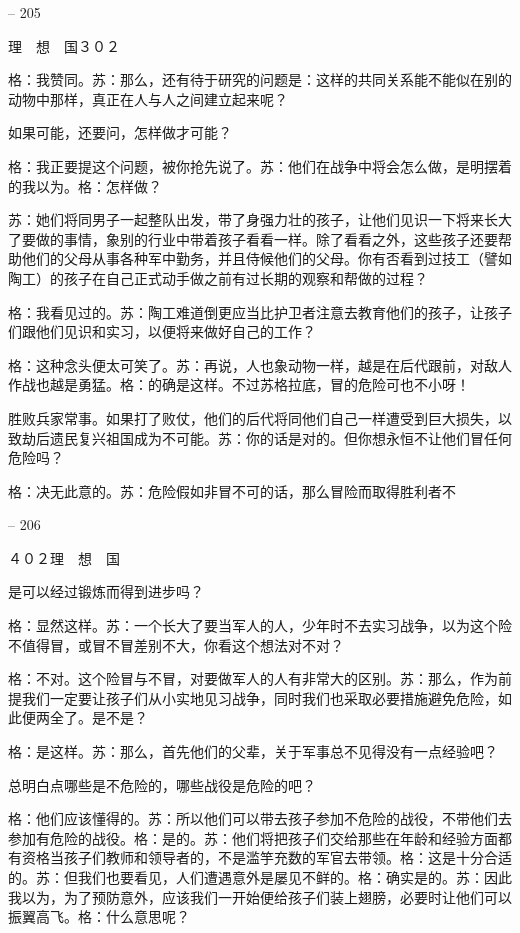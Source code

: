 \documentclass[11pt,oneside]{book}
\begin{document}
\begin{common-format}
    

-- 205

    理　想　国３０２

    格：我赞同。苏：那么，还有待于研究的问题是：这样的共同关系能不能似在别的动物中那样，真正在人与人之间建立起来呢？

    如果可能，还要问，怎样做才可能？

    格：我正要提这个问题，被你抢先说了。苏：他们在战争中将会怎么做，是明摆着的我以为。格：怎样做？

    苏：她们将同男子一起整队出发，带了身强力壮的孩子，让他们见识一下将来长大了要做的事情，象别的行业中带着孩子看看一样。除了看看之外，这些孩子还要帮助他们的父母从事各种军中勤务，并且侍候他们的父母。你有否看到过技工（譬如陶工）的孩子在自己正式动手做之前有过长期的观察和帮做的过程？

    格：我看见过的。苏：陶工难道倒更应当比护卫者注意去教育他们的孩子，让孩子们跟他们见识和实习，以便将来做好自己的工作？

    格：这种念头便太可笑了。苏：再说，人也象动物一样，越是在后代跟前，对敌人作战也越是勇猛。格：的确是这样。不过苏格拉底，冒的危险可也不小呀！

    胜败兵家常事。如果打了败仗，他们的后代将同他们自己一样遭受到巨大损失，以致劫后遗民复兴祖国成为不可能。苏：你的话是对的。但你想永恒不让他们冒任何危险吗？

    格：决无此意的。苏：危险假如非冒不可的话，那么冒险而取得胜利者不

    

-- 206

    ４０２理　想　国

    是可以经过锻炼而得到进步吗？

    格：显然这样。苏：一个长大了要当军人的人，少年时不去实习战争，以为这个险不值得冒，或冒不冒差别不大，你看这个想法对不对？

    格：不对。这个险冒与不冒，对要做军人的人有非常大的区别。苏：那么，作为前提我们一定要让孩子们从小实地见习战争，同时我们也采取必要措施避免危险，如此便两全了。是不是？

    格：是这样。苏：那么，首先他们的父辈，关于军事总不见得没有一点经验吧？

    总明白点哪些是不危险的，哪些战役是危险的吧？

    格：他们应该懂得的。苏：所以他们可以带去孩子参加不危险的战役，不带他们去参加有危险的战役。格：是的。苏：他们将把孩子们交给那些在年龄和经验方面都有资格当孩子们教师和领导者的，不是滥竽充数的军官去带领。格：这是十分合适的。苏：但我们也要看见，人们遭遇意外是屡见不鲜的。格：确实是的。苏：因此我以为，为了预防意外，应该我们一开始便给孩子们装上翅膀，必要时让他们可以振翼高飞。格：什么意思呢？


\end{common-format}
\end{document}
